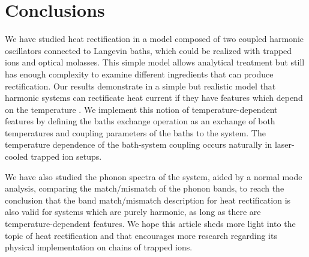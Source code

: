 %
\section{Conclusions \label{sec:Conclusions}}
%
We have studied heat rectification in a model composed of two coupled harmonic oscillators connected to Langevin baths, which could be realized with trapped ions and optical molasses. This simple model allows analytical treatment but still has enough complexity to examine different ingredients that can produce rectification. %
Our results demonstrate in a simple but realistic model that harmonic systems can rectificate heat current if they have features which depend on the temperature  \cite{Pereira2017}. We implement this notion of temperature-dependent features by defining the baths exchange operation as an exchange of both temperatures and coupling parameters of the baths to the system. The temperature dependence of the bath-system coupling  occurs naturally in laser-cooled trapped ion setups.

We have also studied the phonon spectra of the system, aided by a normal mode analysis,
comparing the match/mismatch of the phonon bands, to reach the conclusion that the band match/mismatch description for heat rectification is also valid for systems which are purely harmonic, as long as there are temperature-dependent features.
We hope this article sheds more light into the topic of heat rectification and that encourages more research regarding its physical implementation on chains of trapped ions.
